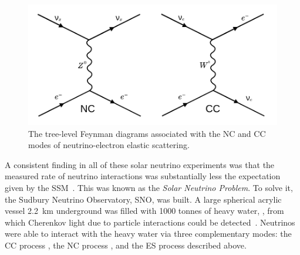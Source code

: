 \begin{figure}
    \centering
    \includegraphics[width=\textwidth]{1_NeutrinoTheory/Figs/feynman_diag_nu_e_es.pdf}
    \caption[The two tree-level Feynman diagrams associated with neutrino-electron elastic scattering]
    {The tree-level Feynman diagrams associated with the NC and CC modes of neutrino-electron elastic scattering.}
    \label{fig:nu_e_es_feynman_diagrams}
\end{figure}



A consistent finding in all of these solar neutrino experiments was that the measured rate of neutrino interactions was substantially less the expectation given by the SSM~\cite{clevelandMeasurementSolarElectron1998,abdurashitovMeasurementSolarNeutrino2009,altmannCompleteResultsFive2005,abeSolarNeutrinoMeasurements2016}. This was known as the \textit{Solar Neutrino Problem}. To solve it, the Sudbury Neutrino Observatory, SNO, was built. A large spherical acrylic vessel \SI{2.2}{\km} underground was filled with \num{1000} tonnes of heavy water, , from which Cherenkov light due to particle interactions could be detected~\cite{BOGER2000172}. Neutrinos were able to interact with the heavy water via three complementary modes: the CC process , the NC process , and the ES process described above.

